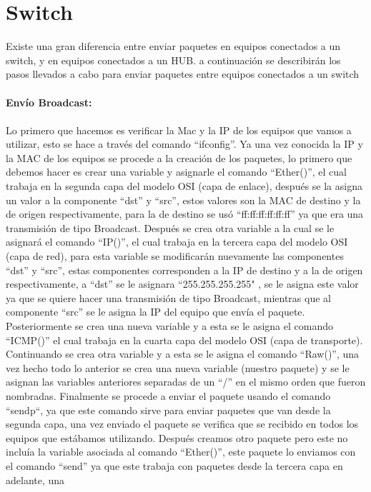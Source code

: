 \documentclass{udpreport}
\begin{document}
	\section{Switch}
		Existe una gran diferencia entre enviar paquetes en equipos conectados a un switch, y en equipos conectados a un HUB. a
		continuación se describirán los pasos llevados a cabo para enviar paquetes entre equipos conectados a un switch\\\\
		{\bf \large Envío Broadcast:}\\\\
		Lo primero que hacemos es verificar la Mac y la IP de los equipos que vamos a utilizar, esto se hace a través del
		comando “ifconfig”. Ya una vez conocida la IP y la MAC de los equipos se procede a la creación de los paquetes, lo
		primero que debemos hacer es crear una variable y asignarle el comando “Ether()”, el cual trabaja en la segunda capa
		del modelo OSI (capa de enlace), después se la asigna un valor a la componente “dst” y “src”, estos valores son la MAC
		de destino
		y la de origen respectivamente, para la de destino se usó “ff:ff:ff:ff:ff:ff” ya que era una transmisión de tipo
		Broadcast. Después se crea otra variable a la cual se le asignará el comando “IP()”, el cual trabaja en la tercera
		capa del modelo OSI (capa de red), para esta variable se modificarán nuevamente las componentes “dst” y “src”, estas
		componentes corresponden a la IP de destino y a la de origen respectivamente, a “dst” se le asignara “255.255.255.255"
		, se le asigna este valor ya que se quiere hacer una transmisión de tipo Broadcast, mientras que al componente “src”
		se le asigna la IP del equipo que envía el paquete. Posteriormente se crea una nueva variable y a esta se le asigna el
		comando “ICMP()” el cual trabaja en la cuarta capa del modelo OSI (capa de transporte). Continuando se crea otra
		variable y a esta se le asigna el comando “Raw()”, una vez hecho todo lo anterior se crea una nueva variable (nuestro
		paquete)  y se le asignan las variables anteriores separadas de un “/” en el mismo orden que fueron nombradas.
		Finalmente se procede a enviar el paquete usando el comando “sendp“, ya que este comando sirve para enviar paquetes
		que van desde la segunda capa, una vez enviado el paquete se verifica que se recibido en todos los equipos que
		estábamos utilizando. Después creamos otro paquete pero este no incluía la variable asociada al comando “Ether()”,
		este paquete lo enviamos con el comando “send” ya que este trabaja con paquetes desde la tercera capa en adelante, una
\end{document}
